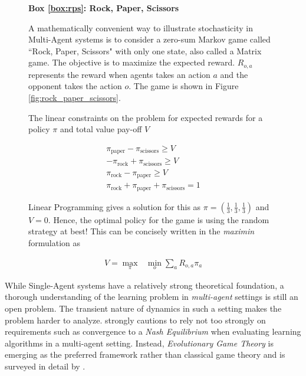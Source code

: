 \documentclass[12pt,a4paper]{article}
\begin{document}
\begin{figure}[ht]
\begin{tcolorbox}[label=box:rps,colback=white]

\textbf{\large{Box \ref{box:rps}: Rock, Paper, Scissors}}

A mathematically convenient way to illustrate stochasticity in Multi-Agent systems is to consider
a zero-sum Markov game called ``Rock, Paper, Scissors" with only one state, also called a 
Matrix game. The objective is to maximize the expected reward. $R_{o,a}$ represents the reward
when agents takes an action $a$ and the opponent takes the action $o$. The game is shown in
Figure \ref{fig:rock_paper_scissors}.

The linear constraints on the problem for expected rewards for a policy $\pi$ and total value
pay-off $V$

\begin{align}
\pi_{\text{paper}} - \pi_{\text{scissors}} \geq V \\
- \pi_{\text{rock}} + \pi_{\text{scissors}} \geq V \\
\pi_{\text{rock}} - \pi_{\text{paper}} \geq V \\
\pi_{\text{rock}} + \pi_{\text{paper}} + \pi_{\text{scissors}} = 1
\end{align}

Linear Programming gives a solution for this as $\pi = (\frac{1}{3}, \frac{1}{3}, \frac{1}{3})$ and
$V = 0$. Hence, the optimal policy for the game is using the random strategy at best! This
can be concisely written in the \textit{maximin} formulation as 

\begin{align}
V = \underset{\pi}{\max}\text{ }\underset{o}{\min} \sum_{a} R_{o,a} \pi_a
\end{align}

\end{tcolorbox}
\end{figure}

While Single-Agent systems have a relatively strong theoretical foundation, a thorough
understanding of the learning problem in \textit{multi-agent} settings is still an open problem.
The transient nature of dynamics in such a setting makes the problem harder to analyze.
\cite{Shoham:2007:MLA:1247754.1248180} strongly cautions to rely not too strongly on
requirements such as convergence to a \textit{Nash Equilibrium} when evaluating learning
algorithms in a multi-agent setting. Instead, \textit{Evolutionary Game Theory} is emerging as
the preferred framework rather than classical game theory and is surveyed in detail by 
\cite{Bloembergen:2015:EDM:2831071.2831085}.
\end{document}
